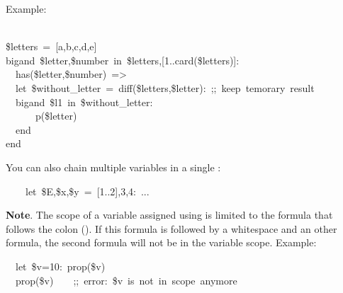 {Example:%
\begin{mdpre}%
\\
{\$letters}~=~{}[a,b,c,d,e]\\
{bigand}~{\$letter},{\$number}~{in}~{\$letters},{}[{1}..{card}({\$letters})]:\\
~~has({\$letter},{\$number})~=\textgreater{}\\
~~{let}~{\$without\_letter}~=~{diff}({\$letters},{\$letter}):~{;;~keep~temorary~result}\\
~~{bigand}~{\$l1}~{in}~{\$without\_letter}:\\
~~~~~~p({\$letter})\\
~~{end}\\
{end}%
\end{mdpre}\noindent You can also chain multiple variables in a single :
\begin{mdpre}%
\noindent~~~~{let}~{\$E},{\$x},{\$y}~=~{}[{1}..{2}],{3},{4}:~...%
\end{mdpre}
\noindent\textbf{Note}.
The scope of a variable assigned using  is limited to the formula
that follows the colon (\mdcode{:}). If this formula is followed by a whitespace
and an other formula, the second formula will not be in the variable
scope. Example:%
\begin{mdpre}%
\noindent~~{let}~{\$v}={10}:~prop({\$v})\\
~~prop({\$v})~~~~{;;~error:~\$v~is~not~in~scope~anymore}%
\end{mdpre}%

}
